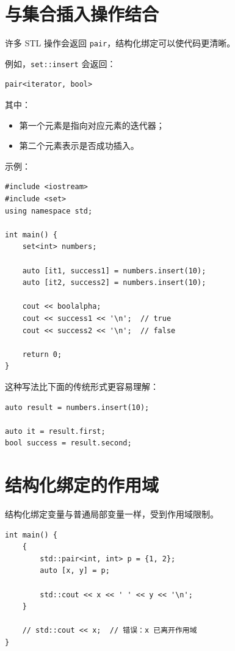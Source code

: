 \documentclass[UTF8,12pt,a4paper]{ctexart}
\begin{document}
\section{与集合插入操作结合}

许多 STL 操作会返回 \texttt{pair}，结构化绑定可以使代码更清晰。

例如，\texttt{set::insert} 会返回：

\begin{lstlisting}
pair<iterator, bool>
\end{lstlisting}

其中：

\begin{itemize}
    \item 第一个元素是指向对应元素的迭代器；
    \item 第二个元素表示是否成功插入。
\end{itemize}

示例：

\begin{lstlisting}
#include <iostream>
#include <set>
using namespace std;

int main() {
    set<int> numbers;

    auto [it1, success1] = numbers.insert(10);
    auto [it2, success2] = numbers.insert(10);

    cout << boolalpha;
    cout << success1 << '\n';  // true
    cout << success2 << '\n';  // false

    return 0;
}
\end{lstlisting}

这种写法比下面的传统形式更容易理解：

\begin{lstlisting}
auto result = numbers.insert(10);

auto it = result.first;
bool success = result.second;
\end{lstlisting}

\section{结构化绑定的作用域}

结构化绑定变量与普通局部变量一样，受到作用域限制。

\begin{lstlisting}
int main() {
    {
        std::pair<int, int> p = {1, 2};
        auto [x, y] = p;

        std::cout << x << ' ' << y << '\n';
    }

    // std::cout << x;  // 错误：x 已离开作用域
}
\end{lstlisting}
\end{document}
